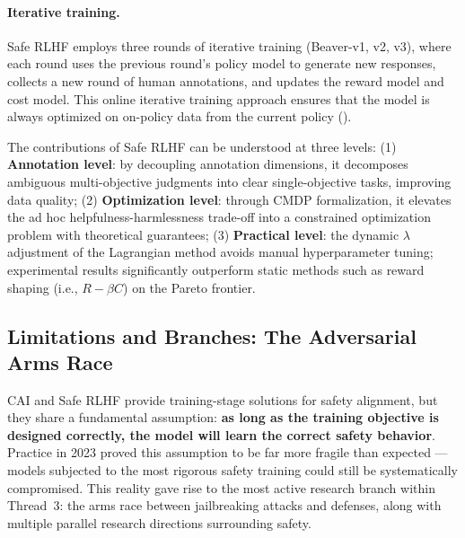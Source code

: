 \paragraph{Iterative training.}
Safe RLHF employs three rounds of iterative training (Beaver-v1, v2, v3),
where each round uses the previous round's policy model to generate new responses,
collects a new round of human annotations, and updates the reward model and cost model.
This online iterative training approach ensures that the model is always optimized on on-policy data from the current policy
().

\begin{solutionbox}
The contributions of Safe RLHF can be understood at three levels:
(1) \textbf{Annotation level}: by decoupling annotation dimensions, it decomposes ambiguous multi-objective judgments into clear single-objective tasks,
improving data quality;
(2) \textbf{Optimization level}: through CMDP formalization, it elevates the ad hoc helpfulness-harmlessness trade-off
into a constrained optimization problem with theoretical guarantees;
(3) \textbf{Practical level}: the dynamic $\lambda$ adjustment of the Lagrangian method avoids manual hyperparameter tuning;
experimental results significantly outperform static methods such as reward shaping (i.e., $R - \beta C$) on the Pareto frontier.
\end{solutionbox}


\subsection{Limitations and Branches: The Adversarial Arms Race}
\label{sec:t3-branches}

CAI and Safe RLHF provide training-stage solutions for safety alignment,
but they share a fundamental assumption:
\textbf{as long as the training objective is designed correctly, the model will learn the correct safety behavior}.
Practice in 2023 proved this assumption to be far more fragile than expected ---
models subjected to the most rigorous safety training could still be systematically compromised.
This reality gave rise to the most active research branch within Thread~3:
the arms race between jailbreaking attacks and defenses, along with multiple parallel research directions surrounding safety.


